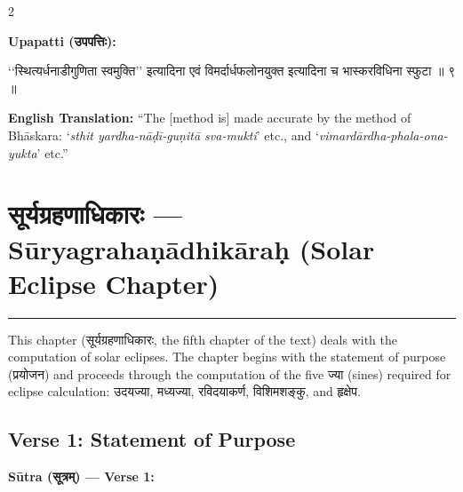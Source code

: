 \documentclass[11pt,a4paper]{article}
\newcommand{\dev}[1]{{\devanagarifont #1}}
\newenvironment{sanskritverse}{%
  \begin{center}\begin{minipage}{0.95\textwidth}
  \setlength{\leftskip}{1em}
  \setlength{\rightskip}{1em}
  \dev
}{\end{minipage}\end{center}}
\begin{document}
\vspace{0.5em}

\begin{paracol}{2}

\noindent\textbf{Upapatti (\dev{उपपत्तिः}):}
\begin{sanskritverse}
``स्थित्यर्धनाडीगुणिता स्वमुक्ति'' इत्यादिना एवं विमर्दार्धफलोनयुक्त इत्यादिना च
भास्करविधिना स्फुटा ॥ ९ ॥
\end{sanskritverse}

\switchcolumn

\textbf{English Translation:} ``The [method is] made accurate by the method of Bhāskara: `\textit{sthit yardha-nāḍī-guṇitā sva-mukti}' etc., and `\textit{vimardārdha-phala-ona-yukta}' etc.''

\end{paracol}

\newpage


\section{\texorpdfstring{{\devanagarifont सूर्यग्रहणाधिकारः} — Sūryagrahaṇādhikāraḥ (Solar Eclipse Chapter)}{Sūryagrahaṇādhikāraḥ (Solar Eclipse Chapter)}}
\label{sec:surya-grahana}

\begin{center}
\textcolor{rulecolor}{\rule{0.8\textwidth}{0.5pt}}
\end{center}

This chapter (\dev{सूर्यग्रहणाधिकारः}, the fifth chapter of the text) deals with the computation of solar eclipses. The chapter begins with the statement of purpose (\dev{प्रयोजन}) and proceeds through the computation of the five \dev{ज्या} (sines) required for eclipse calculation: \dev{उदयज्या}, \dev{मध्यज्या}, \dev{रविदयाकर्ण}, \dev{विशिमशङ्कु}, and \dev{हृक्षेप}.

\subsection{Verse 1: Statement of Purpose}

\vspace{0.5em}
\noindent\textbf{Sūtra (\dev{सूत्रम्}) — Verse 1:}
\end{document}

